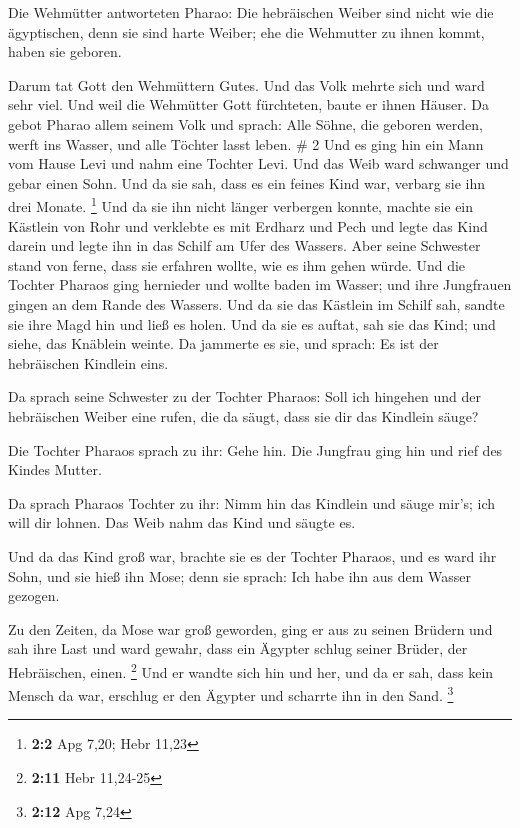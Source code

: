  Die Wehmütter antworteten Pharao: Die hebräischen Weiber
sind nicht wie die ägyptischen, denn sie sind harte Weiber; ehe die
Wehmutter zu ihnen kommt, haben sie geboren.

 Darum tat Gott den Wehmüttern Gutes. Und das Volk mehrte
sich und ward sehr viel.  Und weil die Wehmütter Gott
fürchteten, baute er ihnen Häuser.  Da gebot Pharao allem
seinem Volk und sprach: Alle Söhne, die geboren werden, werft ins
Wasser, und alle Töchter lasst leben. \# 2  Und es ging
hin ein Mann vom Hause Levi und nahm eine Tochter Levi. 
Und das Weib ward schwanger und gebar einen Sohn. Und da sie sah, dass
es ein feines Kind war, verbarg sie ihn drei Monate. \footnote{\textbf{2:2}
  Apg 7,20; Hebr 11,23}  Und da sie ihn nicht länger
verbergen konnte, machte sie ein Kästlein von Rohr und verklebte es mit
Erdharz und Pech und legte das Kind darein und legte ihn in das Schilf
am Ufer des Wassers.  Aber seine Schwester stand von
ferne, dass sie erfahren wollte, wie es ihm gehen würde. 
Und die Tochter Pharaos ging hernieder und wollte baden im Wasser; und
ihre Jungfrauen gingen an dem Rande des Wassers. Und da sie das Kästlein
im Schilf sah, sandte sie ihre Magd hin und ließ es holen.
 Und da sie es auftat, sah sie das Kind; und siehe, das
Knäblein weinte. Da jammerte es sie, und sprach: Es ist der hebräischen
Kindlein eins.

 Da sprach seine Schwester zu der Tochter Pharaos: Soll
ich hingehen und der hebräischen Weiber eine rufen, die da säugt, dass
sie dir das Kindlein säuge?

 Die Tochter Pharaos sprach zu ihr: Gehe hin. Die Jungfrau
ging hin und rief des Kindes Mutter.

 Da sprach Pharaos Tochter zu ihr: Nimm hin das Kindlein
und säuge mir's; ich will dir lohnen. Das Weib nahm das Kind und säugte
es.

 Und da das Kind groß war, brachte sie es der Tochter
Pharaos, und es ward ihr Sohn, und sie hieß ihn Mose; denn sie sprach:
Ich habe ihn aus dem Wasser gezogen.

 Zu den Zeiten, da Mose war groß geworden, ging er aus zu
seinen Brüdern und sah ihre Last und ward gewahr, dass ein Ägypter
schlug seiner Brüder, der Hebräischen, einen. \footnote{\textbf{2:11}
  Hebr 11,24-25}  Und er wandte sich hin und her, und da
er sah, dass kein Mensch da war, erschlug er den Ägypter und scharrte
ihn in den Sand. \footnote{\textbf{2:12} Apg 7,24}

